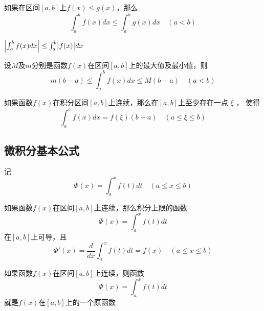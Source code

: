 \documentclass[11pt]{article}
\begin{document}
\begin{corollary}[]
如果在区间\([a,b]\)上\(f(x)\le g(x)\)，那么
\begin{equation*}
\int_a^bf(x)dx\le\int_a^bg(x)dx\quad(a<b)
\end{equation*}
\end{corollary}

\begin{corollary}[]
\(\abs{\int_a^bf(x)dx}\le\int_a^b\abs{f(x)}dx\)
\end{corollary}

\begin{proposition}[]
设\(M\)及\(m\)分别是函数\(f(x)\)在区间\([a,b]\)上的最大值及最小值，则
\begin{equation*}
m(b-a)\le\int_a^bf(x)dx\le M(b-a)\quad(a<b)
\end{equation*}
\end{proposition}

\begin{theorem}[定积分中值定理]
如果函数\(f(x)\)在积分区间\([a,b]\)上连续，那么在\([a,b]\)上至少存在一点 \(\xi\) ，
使得
\begin{equation*}
\int_a^bf(x)dx=f(\xi)(b-a)\quad(a\le\xi\le b)
\end{equation*}
\end{theorem}
\subsection{微积分基本公式}
\label{sec:orgd82a5a5}
记
\begin{equation*}
\Phi(x)=\int^x_af(t)dt\quad(a\le x\le b)
\end{equation*}

\begin{theorem}[]
如果函数\(f(x)\)在区间\([a,b]\)上连续，那么积分上限的函数
\begin{equation*}
\Phi(x)=\int_a^xf(t)dt
\end{equation*}
在\([a,b]\)上可导，且
\begin{equation*}
\Phi'(x)=\frac{d}{dx}\int_a^xf(t)dt=f(x)\quad(a\le x\le b)
\end{equation*}
\end{theorem}

\begin{theorem}[]
如果函数\(f(x)\)在区间\([a,b]\)上连续，则函数
\begin{equation*}
\Phi(x)=\int_a^xf(t)dt
\end{equation*}
就是\(f(x)\)在\([a,b]\)上的一个原函数
\end{theorem}
\end{document}
